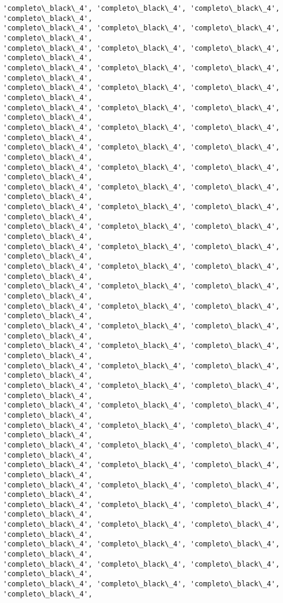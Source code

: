 \documentclass[11pt]{article}
\begin{document}
\begin{Verbatim}[commandchars=\\\{\}]
'completo\_black\_4', 'completo\_black\_4', 'completo\_black\_4', 'completo\_black\_4',
'completo\_black\_4', 'completo\_black\_4', 'completo\_black\_4', 'completo\_black\_4',
'completo\_black\_4', 'completo\_black\_4', 'completo\_black\_4', 'completo\_black\_4',
'completo\_black\_4', 'completo\_black\_4', 'completo\_black\_4', 'completo\_black\_4',
'completo\_black\_4', 'completo\_black\_4', 'completo\_black\_4', 'completo\_black\_4',
'completo\_black\_4', 'completo\_black\_4', 'completo\_black\_4', 'completo\_black\_4',
'completo\_black\_4', 'completo\_black\_4', 'completo\_black\_4', 'completo\_black\_4',
'completo\_black\_4', 'completo\_black\_4', 'completo\_black\_4', 'completo\_black\_4',
'completo\_black\_4', 'completo\_black\_4', 'completo\_black\_4', 'completo\_black\_4',
'completo\_black\_4', 'completo\_black\_4', 'completo\_black\_4', 'completo\_black\_4',
'completo\_black\_4', 'completo\_black\_4', 'completo\_black\_4', 'completo\_black\_4',
'completo\_black\_4', 'completo\_black\_4', 'completo\_black\_4', 'completo\_black\_4',
'completo\_black\_4', 'completo\_black\_4', 'completo\_black\_4', 'completo\_black\_4',
'completo\_black\_4', 'completo\_black\_4', 'completo\_black\_4', 'completo\_black\_4',
'completo\_black\_4', 'completo\_black\_4', 'completo\_black\_4', 'completo\_black\_4',
'completo\_black\_4', 'completo\_black\_4', 'completo\_black\_4', 'completo\_black\_4',
'completo\_black\_4', 'completo\_black\_4', 'completo\_black\_4', 'completo\_black\_4',
'completo\_black\_4', 'completo\_black\_4', 'completo\_black\_4', 'completo\_black\_4',
'completo\_black\_4', 'completo\_black\_4', 'completo\_black\_4', 'completo\_black\_4',
'completo\_black\_4', 'completo\_black\_4', 'completo\_black\_4', 'completo\_black\_4',
'completo\_black\_4', 'completo\_black\_4', 'completo\_black\_4', 'completo\_black\_4',
'completo\_black\_4', 'completo\_black\_4', 'completo\_black\_4', 'completo\_black\_4',
'completo\_black\_4', 'completo\_black\_4', 'completo\_black\_4', 'completo\_black\_4',
'completo\_black\_4', 'completo\_black\_4', 'completo\_black\_4', 'completo\_black\_4',
'completo\_black\_4', 'completo\_black\_4', 'completo\_black\_4', 'completo\_black\_4',
'completo\_black\_4', 'completo\_black\_4', 'completo\_black\_4', 'completo\_black\_4',
'completo\_black\_4', 'completo\_black\_4', 'completo\_black\_4', 'completo\_black\_4',
'completo\_black\_4', 'completo\_black\_4', 'completo\_black\_4', 'completo\_black\_4',
'completo\_black\_4', 'completo\_black\_4', 'completo\_black\_4', 'completo\_black\_4',
'completo\_black\_4', 'completo\_black\_4', 'completo\_black\_4', 'completo\_black\_4',

\end{Verbatim}
\end{document}
